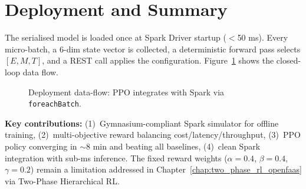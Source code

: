 \section{Deployment and Summary}
\label{sec:deploy_rl}
The serialised model is loaded once at Spark Driver startup ($<$50 ms). Every
micro-batch, a 6-dim state vector is collected, a deterministic forward pass selects
$[E,M,T]$, and a REST call applies the configuration. Figure~\ref{fig:deployment_flow}
shows the closed-loop data flow.

\begin{figure}[H]
\centering
{}
\caption{Deployment data-flow: PPO integrates with Spark via \texttt{foreachBatch}.}
\label{fig:deployment_flow}
\end{figure}

\noindent \textbf{Key contributions:} (1)~Gymnasium-compliant Spark simulator for
offline training, (2)~multi-objective reward balancing cost/latency/throughput,
(3)~PPO policy converging in $\sim$8 min and beating all baselines, (4)~clean Spark
integration with sub-ms inference. The fixed reward weights ($\alpha{=}0.4$,
$\beta{=}0.4$, $\gamma{=}0.2$) remain a limitation addressed in
Chapter~\ref{chap:two_phase_rl_openfaas} via Two-Phase Hierarchical RL.
